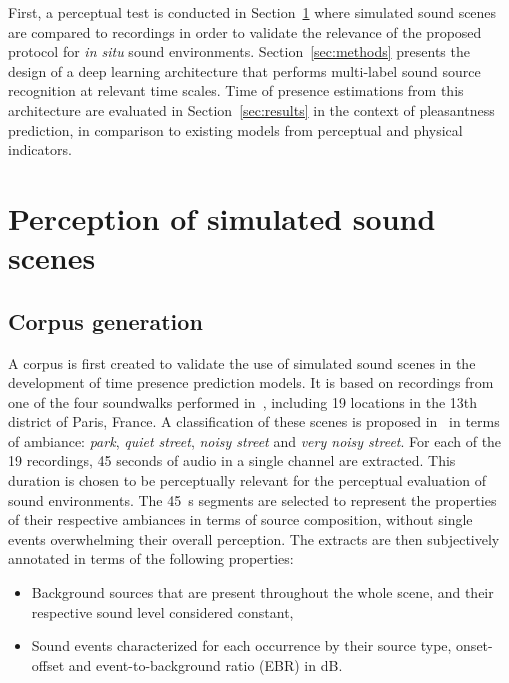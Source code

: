 \documentclass[twocolumn]{article}
\begin{document}
First, a perceptual test is conducted in Section~\ref{sec:data} where simulated sound scenes are compared to recordings in order to validate the relevance of the proposed protocol for \textit{in situ} sound environments. Section~\ref{sec:methods} presents the design of a deep learning architecture that performs multi-label sound source recognition at relevant time scales. Time of presence estimations from this architecture are evaluated in Section~\ref{sec:results} in the context of pleasantness prediction, in comparison to existing models from perceptual and physical indicators.

\section{Perception of simulated sound scenes}
\label{sec:data}

\subsection{Corpus generation}
\label{sec:data_corp}

A corpus is first created to validate the use of simulated sound scenes in the development of time presence prediction models. It is based on recordings from one of the four soundwalks performed in~\cite{aumond2017}, including 19 locations in the 13th district of Paris, France. A classification of these scenes is proposed in~\cite{gloaguen2017} in terms of ambiance: \textit{park}, \textit{quiet street}, \textit{noisy street} and \textit{very noisy street}. For each of the 19 recordings, 45 seconds of audio in a single channel are extracted. This duration is chosen to be perceptually relevant for the perceptual evaluation of sound environments. The 45~s segments are selected to represent the properties of their respective ambiances in terms of source composition, without single events overwhelming their overall perception. The extracts are then subjectively annotated in terms of the following properties:

\begin{itemize}
\item Background sources that are present throughout the whole scene, and their respective sound level considered constant,
\item Sound events characterized for each occurrence by their source type, onset-offset and event-to-background ratio (EBR) in dB.
\end{itemize}
\end{document}
